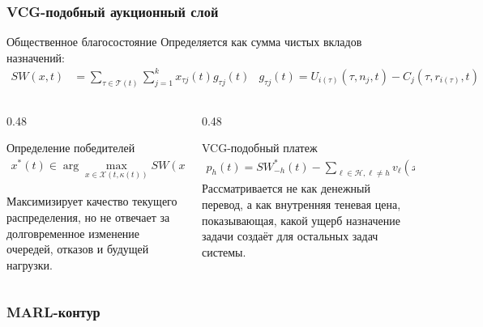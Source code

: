 \begin{frame}
	\frametitle{VCG-подобный аукционный слой}
	\small
	\begin{block}{Общественное благосостояние}
		Определяется как сумма чистых вкладов назначений:
		\begin{align*}
			SW(x,t)&=\sum_{\tau\in\mathcal{T}(t)}\sum_{j=1}^{k}x_{\tau j}(t)g_{\tau j}(t) & g_{\tau j}(t)=U_{i(\tau)}(\tau,n_j,t)-C_j(\tau,r_{i(\tau)},t)
		\end{align*}
	\end{block}
	\begin{columns}[T,onlytextwidth]
		\begin{column}{0.48\textwidth}
			\begin{block}{Определение победителей}
				\begin{align*}
					x^*(t)\in\arg\max_{x\in\mathcal{X}(t,\kappa(t))}SW(x,t).
				\end{align*}
			\end{block}
			Максимизирует качество текущего распределения, но не отвечает за долговременное изменение очередей, отказов и будущей нагрузки.
		\end{column}
		\begin{column}{0.48\textwidth}
			\begin{block}{VCG-подобный платеж}
				\begin{align*}
					p_h(t)=SW^*_{-h}(t)-\sum_{\ell\in\mathcal{H},\ell\neq h}v_{\ell}(x^*(t),t).
				\end{align*}
				Рассматривается не как денежный перевод, а как внутренняя теневая цена, показывающая, какой ущерб назначение задачи создаёт для остальных задач системы.
			\end{block}
		\end{column}
	\end{columns}
\end{frame}

\begin{frame}
	\frametitle{MARL-контур}
	\small
	\begin{center}
	\end{center}
\end{frame}

